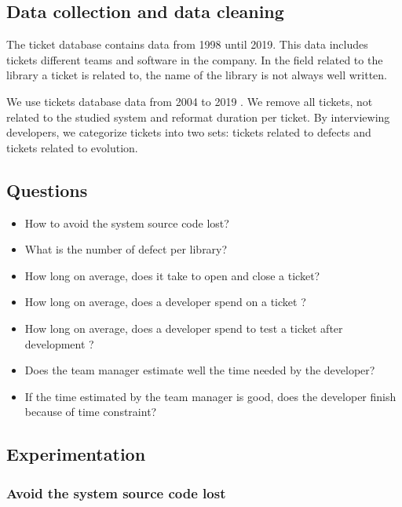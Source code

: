 \documentclass[10pt,conference]{IEEEtran}
\begin{document}
\subsection{Data collection and data cleaning}

The ticket database contains data from 1998  until 2019. 
This data includes tickets  different teams and software in  the company. 
In the field related to the  library a ticket is related to,  the name of the library is not always well written. 

We use tickets database data from 2004 to 2019 . 
We  remove all tickets, not related  to the studied system and reformat duration per ticket.
By interviewing developers, we categorize tickets into two sets: tickets related to defects and tickets related to evolution.

 \subsection{Questions}
 \begin{itemize}
 \item How to avoid the system source code lost?
 \item What is the number of defect per library?
 \item How long on average, does it take to open and close a ticket?
 \item How long on average,  does a developer spend on a ticket ?
 \item How long on average, does a developer spend to test a ticket after development ?
 \item Does the team manager estimate well  the time needed by the developer?
 \item If the time estimated by the team manager is good, does the developer finish because  of time constraint?
 \end{itemize}
 
 \subsection{Experimentation}

\subsubsection{Avoid the system source code lost}
\end{document}
